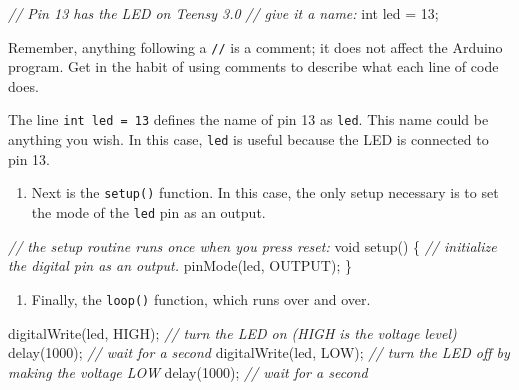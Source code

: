 \documentclass[]{book}
\newenvironment{Shaded}{\begin{snugshade}}{\end{snugshade}}
\newcommand{\CommentTok}[1]{\textcolor[rgb]{0.56,0.35,0.01}{\textit{#1}}}
\newcommand{\DataTypeTok}[1]{\textcolor[rgb]{0.13,0.29,0.53}{#1}}
\newcommand{\DecValTok}[1]{\textcolor[rgb]{0.00,0.00,0.81}{#1}}
\newcommand{\NormalTok}[1]{#1}
\providecommand{\tightlist}{%
  \setlength{\itemsep}{0pt}\setlength{\parskip}{0pt}}
\begin{document}
\begin{Shaded}
\begin{Highlighting}[]
    \CommentTok{// Pin 13 has the LED on Teensy 3.0}
    \CommentTok{// give it a name:}
    \DataTypeTok{int}\NormalTok{ led = }\DecValTok{13}\NormalTok{;}
\end{Highlighting}
\end{Shaded}

Remember, anything following a \texttt{//} is a comment; it does not affect the Arduino program. Get in the habit of using comments to describe what each line of code does.

The line \texttt{int\ led\ =\ 13} defines the name of pin 13 as \texttt{led}. This name could be anything you wish. In this case, \texttt{led} is useful because the LED is connected to pin 13.

\begin{enumerate}
\def\labelenumi{\arabic{enumi}.}
\setcounter{enumi}{3}
\tightlist
\item
  Next is the \texttt{setup()} function. In this case, the only setup necessary is to set the mode of the \texttt{led} pin as an output.
\end{enumerate}

\begin{Shaded}
\begin{Highlighting}[]
  \CommentTok{// the setup routine runs once when you press reset:}
  \DataTypeTok{void}\NormalTok{ setup() \{                }
    \CommentTok{// initialize the digital pin as an output.}
\NormalTok{    pinMode(led, OUTPUT);     }
\NormalTok{  \}}
\end{Highlighting}
\end{Shaded}

\begin{enumerate}
\def\labelenumi{\arabic{enumi}.}
\setcounter{enumi}{4}
\tightlist
\item
  Finally, the \texttt{loop()} function, which runs over and over.
\end{enumerate}

\begin{Shaded}
\begin{Highlighting}[]
\NormalTok{  digitalWrite(led, HIGH);   }\CommentTok{// turn the LED on (HIGH is the voltage level)}
\NormalTok{  delay(}\DecValTok{1000}\NormalTok{);               }\CommentTok{// wait for a second}
\NormalTok{  digitalWrite(led, LOW);    }\CommentTok{// turn the LED off by making the voltage LOW}
\NormalTok{  delay(}\DecValTok{1000}\NormalTok{);               }\CommentTok{// wait for a second}
\end{Highlighting}
\end{Shaded}
\end{document}
